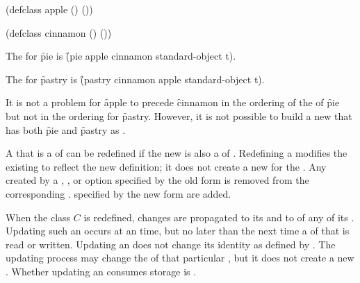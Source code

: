  (defclass apple () ())
 
 (defclass cinnamon () ())
\endcode

The  for \f{pie} is 
\f{(pie apple cinnamon standard-object t)}.

The  for \f{pastry} is  
\f{(pastry cinnamon apple standard-object t)}.

It is not a problem for \f{apple} to precede \f{cinnamon} in the
ordering of the  of \f{pie} but not in the ordering for
\f{pastry}.  However, it is not possible to build a new  that
has both \f{pie} and \f{pastry} as .

\endsubsubsection%

\endsubSection%
                                
A  that is a  of  can
be redefined if the new  is also
a  of .
Redefining a  modifies the existing
  to reflect the new  definition; it does not
create a new   for the .  
Any   created by a , , 
or  option specified by the old  form is
removed from the corresponding .
 specified by the new  form are added.


When the class $C$ is redefined, changes are propagated to its 
and to  of any of its .  Updating such an
 occurs at an  time, but no later than
the next time a  
of that  is read or written.  Updating an
does not change its identity as defined by .
The updating process may change the  of that
particular , 
but it does not create a new .  Whether
updating an  consumes storage is .

